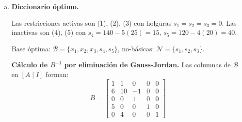 \documentclass{article}
\begin{document}
\begin{enumerate}[a)]

\item \textbf{Diccionario óptimo.}

Las restricciones activas son (1), (2), (3) con holguras $s_1=s_2=s_3=0$. Las inactivas son (4), (5) con $s_4=140-5(25)=15$, $s_5=120-4(20)=40$.

Base óptima: $\mathcal{B}=\{x_1,x_2,x_3,s_4,s_5\}$, no-básicas: $\mathcal{N}=\{s_1,s_2,s_3\}$.

\textbf{Cálculo de $B^{-1}$ por eliminación de Gauss-Jordan.} Las columnas de $\mathcal{B}$ en $[A\mid I]$ forman:
$$B=\begin{bmatrix}1&1&0&0&0\\6&10&-1&0&0\\0&0&1&0&0\\5&0&0&1&0\\0&4&0&0&1\end{bmatrix}$$


\end{enumerate}
\end{document}
